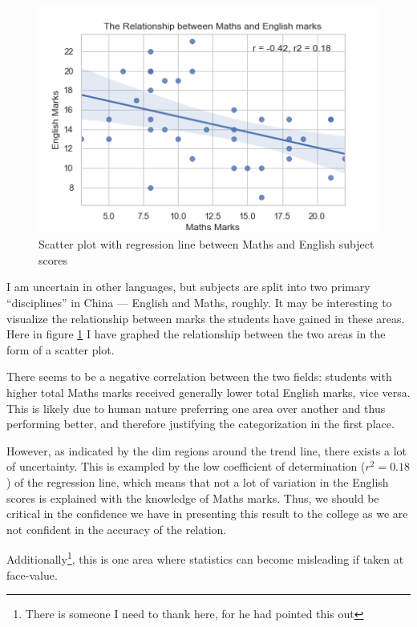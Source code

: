\documentclass[a4paper,12pt]{tufte-handout}
\begin{document}
\begin{figure}
    \centering
    \includegraphics[width=\textwidth]{assets/maths_english.png}
    \caption{Scatter plot with regression line between Maths and English subject scores}
    \label{fig:mathenglish}
\end{figure}

I am uncertain in other languages, but subjects are split into two primary ``disciplines'' in China --- English and Maths, roughly. It may be interesting to visualize the relationship between marks the students have gained in these areas. Here in figure \ref{fig:mathenglish} I have graphed the relationship between the two areas in the form of a scatter plot.

There seems to be a negative correlation between the two fields: students with higher total Maths marks received generally lower total English marks, vice versa. This is likely due to human nature preferring one area over another and thus performing better, and therefore justifying the categorization in the first place.

However, as indicated by the dim regions around the trend line, there exists a lot of uncertainty. This is exampled by the low coefficient of determination ($r^2 = 0.18$)  of the regression line, which means that not a lot of variation in the English scores is explained with the knowledge of Maths marks. Thus, we should be critical in the confidence we have in presenting this result to the college as we are not confident in the accuracy of the relation.

Additionally\footnote{There is someone I need to thank here, for he had pointed this out}, this is one area  where statistics can become misleading if taken at face-value.
\end{document}
